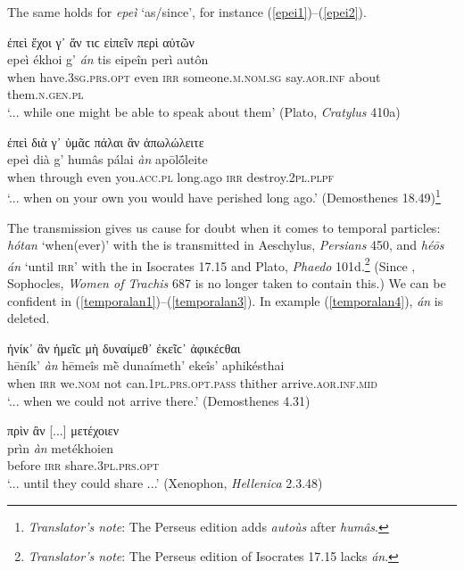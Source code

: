 The same holds for \emph{epeì} `as/since', for instance (\ref{epei1})--(\ref{epei2}).

\begin{exe}
\ex ἐπεὶ ἔχοι γ᾽ ἄν τιϲ εἰπεῖν περὶ αὐτῶν\\
\gll epeì ékhoi g' \emph{án} tis eipeîn perì autôn\\
when have.\textsc{3sg.prs.opt} even \textsc{irr} someone.\textsc{m.nom.sg} say.\textsc{aor.inf} about them.\textsc{n.gen.pl}\\
\trans `... while one might be able to speak about them' (Plato, \textit{Cratylus} 410a)
\label{epei1}
\end{exe}

\begin{exe}
\ex ἐπεὶ διὰ γ᾽ ὑμᾶϲ πάλαι ἂν ἀπωλώλειτε\\
\gll epeì dià g' humâs pálai \emph{àn} apōlṓleite\\
when through even you.\textsc{acc.pl} long.ago \textsc{irr} destroy.\textsc{2pl.plpf}\\
\trans `... when on your own you would have perished long ago.' (Demosthenes 18.49)\footnote{\emph{Translator's note}: The Perseus edition adds \textit{autoùs} after \textit{humâs}.}
\label{epei2}
\end{exe}

The transmission gives us cause for doubt when it comes to temporal particles: \emph{hótan} `when(ever)' with the  is transmitted in Aeschylus, \textit{Persians} 450, and \emph{héōs án} `until \textsc{irr}' with the  in Isocrates 17.15 and Plato, \textit{Phaedo} 101d.\footnote{\emph{Translator's note}: The Perseus edition of Isocrates 17.15 lacks \textit{án}.} (Since \citealp[453]{Elmsley1812}, Sophocles, \textit{Women of Trachis} 687 is no longer taken to contain this.) We can be confident in (\ref{temporalan1})--(\ref{temporalan3}). In example (\ref{temporalan4}), \emph{án} is deleted.

\begin{exe}
\ex ἡνίκ᾽ ἂν ἡμεῖϲ μὴ δυναίμεθ᾽ ἐκεῖϲ᾽ ἀφικέϲθαι\\
\gll hēník' \emph{àn} hēmeîs mḕ dunaímeth' ekeîs' aphikésthai\\
when \textsc{irr} we.\textsc{nom} not can.\textsc{1pl.prs.opt.pass} thither arrive.\textsc{aor.inf.mid}\\
\trans `... when we could not arrive there.' (Demosthenes 4.31)
\label{temporalan1}
\end{exe}

\begin{exe}
\ex πρὶν ἂν {[}...{]} μετέχοιεν\\
\gll prìn \emph{àn} metékhoien\\
before \textsc{irr} share.\textsc{3pl.prs.opt}\\
\trans `... until they could share ...' (Xenophon, \textit{Hellenica} 2.3.48)
\label{temporalan2}
\end{exe}

